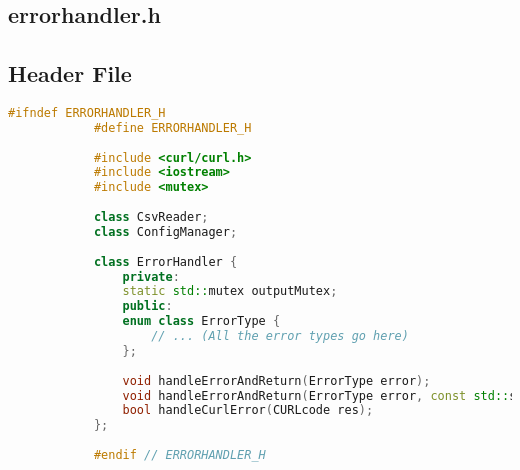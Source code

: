 \documentclass{article}
\begin{document}
	\subsection{errorhandler.h}
	
	\subsection*{Header File}
	\begin{mdframed}[backgroundcolor=background, hidealllines=false, innerleftmargin=15pt, innerrightmargin=5pt, innertopmargin=0pt, innerbottommargin=-5pt, linecolor=accent]
		\begin{lstlisting}[language=C++]
			#ifndef ERRORHANDLER_H
			#define ERRORHANDLER_H
			
			#include <curl/curl.h>
			#include <iostream>
			#include <mutex>
			
			class CsvReader;
			class ConfigManager;
			
			class ErrorHandler {
				private:
				static std::mutex outputMutex;
				public:
				enum class ErrorType {
					// ... (All the error types go here)
				};
				
				void handleErrorAndReturn(ErrorType error);
				void handleErrorAndReturn(ErrorType error, const std::string& extraInfo);
				bool handleCurlError(CURLcode res);
			};
			
			#endif // ERRORHANDLER_H
		\end{lstlisting}
	\end{mdframed}
	
\end{document}
